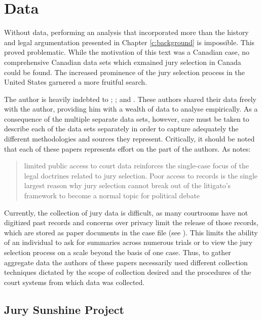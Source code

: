 \chapter{Data} \label{c:data}

Without data, performing an analysis that incorporated more than the history and legal argumentation presented in Chapter
\ref{c:background} is impossible. This proved problematic. While the motivation of this text was a Canadian case, no comprehensive
Canadian data sets which exmained jury selection in Canada could be found. The increased prominence of the jury selection process
in the United States garnered a more fruitful search.

The author is heavily indebted to \citeauthor{JurySunshineProj}; \citeauthor{StubbornLegacy}; and
\citeauthor{PerempChalMurder}. These authors shared their data freely with the author, providing him with a wealth of data to
analyse empirically. As a consequence of the multiple separate data sets, however, care must be taken to describe each of the data
sets separately in order to capture adequately the different methodologies and sources they represent. Critically, it should be
noted that each of these papers represents effort on the part of the authors. As \cite{JurySunshineProj} notes:

\begin{quote}
  \centering
   limited public access to court data reinforces the single-case focus of the legal doctrines related to jury selection. Poor
   access to records is the single largest reason why jury selection cannot break out of the litigato's framework to become a
   normal topic for political debate
\end{quote}

Currently, the collection of jury data is difficult, as many courtrooms have not digitized past records and concerns over privacy
limit the release of those records, which are stored as paper documents in the case file (see \cite{JurySunshineProject}). This
limits the ability of an individual to ask for summaries across numerous trials or to view the jury selection process on a scale
beyond the basis of one case. Thus, to gather aggregate data the authors of these papers necessarily used different collection
techniques dictated by the scope of collection desired and the procedures of the court systems from which data was collected.

\section{Jury Sunshine Project} \label{sec:jspdata}

